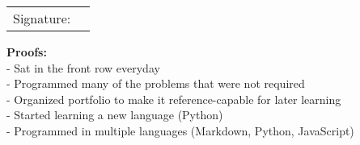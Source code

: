 \documentclass[12pt]{amsart}
\begin{document}
    \begin{tabular}{@{}p{.5in}p{4in}@{}}
    Signature: & \hrulefill \\
    \end{tabular}
    
    \bigskip
    
    \textbf{Proofs:}
    \\
    - Sat in the front row everyday\\
    - Programmed many of the problems that were not required\\
    - Organized portfolio to make it reference-capable for later learning\\
    - Started learning a new language (Python)\\
    - Programmed in multiple languages (Markdown, Python, JavaScript)\\
    
\end{document}
